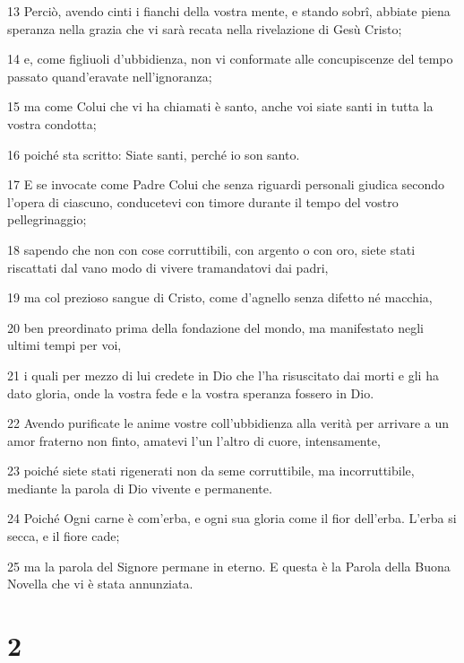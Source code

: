 \par 13 Perciò, avendo cinti i fianchi della vostra mente, e stando sobrî, abbiate piena speranza nella grazia che vi sarà recata nella rivelazione di Gesù Cristo;
\par 14 e, come figliuoli d'ubbidienza, non vi conformate alle concupiscenze del tempo passato quand'eravate nell'ignoranza;
\par 15 ma come Colui che vi ha chiamati è santo, anche voi siate santi in tutta la vostra condotta;
\par 16 poiché sta scritto: Siate santi, perché io son santo.
\par 17 E se invocate come Padre Colui che senza riguardi personali giudica secondo l'opera di ciascuno, conducetevi con timore durante il tempo del vostro pellegrinaggio;
\par 18 sapendo che non con cose corruttibili, con argento o con oro, siete stati riscattati dal vano modo di vivere tramandatovi dai padri,
\par 19 ma col prezioso sangue di Cristo, come d'agnello senza difetto né macchia,
\par 20 ben preordinato prima della fondazione del mondo, ma manifestato negli ultimi tempi per voi,
\par 21 i quali per mezzo di lui credete in Dio che l'ha risuscitato dai morti e gli ha dato gloria, onde la vostra fede e la vostra speranza fossero in Dio.
\par 22 Avendo purificate le anime vostre coll'ubbidienza alla verità per arrivare a un amor fraterno non finto, amatevi l'un l'altro di cuore, intensamente,
\par 23 poiché siete stati rigenerati non da seme corruttibile, ma incorruttibile, mediante la parola di Dio vivente e permanente.
\par 24 Poiché Ogni carne è com'erba, e ogni sua gloria come il fior dell'erba. L'erba si secca, e il fiore cade;
\par 25 ma la parola del Signore permane in eterno. E questa è la Parola della Buona Novella che vi è stata annunziata.

\chapter{2}

